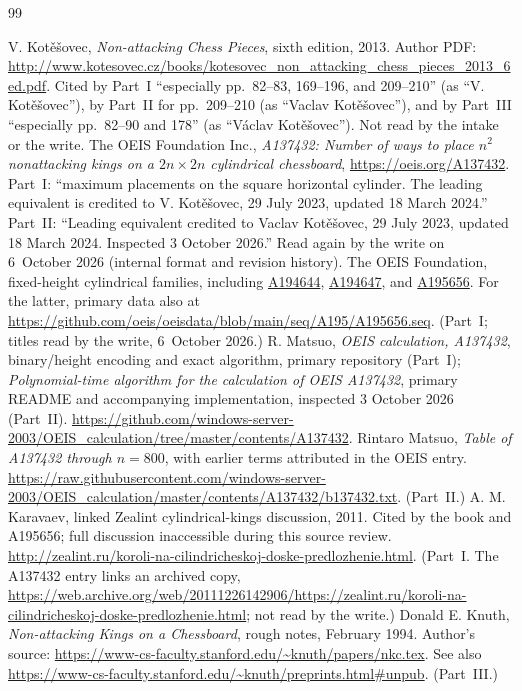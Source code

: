 \documentclass[11pt,letterpaper]{article}
\numberwithin{equation}{section}
\theoremstyle{remark}\newtheorem{remark}[theorem]{Remark}
\begin{document}
\begin{thebibliography}{99}\small\raggedright
{}V. Kot\v{e}\v{s}ovec, \emph{Non-attacking Chess Pieces}, sixth edition, 2013. Author PDF: \url{http://www.kotesovec.cz/books/kotesovec_non_attacking_chess_pieces_2013_6ed.pdf}. Cited by Part~I ``especially pp.~82--83, 169--196, and 209--210'' (as ``V. Kot\v{e}\v{s}ovec''), by Part~II for pp.~209--210 (as ``Vaclav Kot\v{e}\v{s}ovec''), and by Part~III ``especially pp.~82--90 and 178'' (as ``V\'aclav Kot\v e\v sovec''). Not read by the intake or the write.
The OEIS Foundation Inc., \emph{A137432: Number of ways to place $n^2$ nonattacking kings on a $2n\times2n$ cylindrical chessboard}, \url{https://oeis.org/A137432}. Part~I: ``maximum placements on the square horizontal cylinder. The leading equivalent is credited to V. Kot\v{e}\v{s}ovec, 29 July 2023, updated 18 March 2024.'' Part~II: ``Leading equivalent credited to Vaclav Kot\v{e}\v{s}ovec, 29 July 2023, updated 18 March 2024. Inspected 3 October 2026.'' Read again by the write on 6~October 2026 (internal format and revision history).
The OEIS Foundation, fixed-height cylindrical families, including \href{https://oeis.org/A194644}{A194644}, \href{https://oeis.org/A194647}{A194647}, and \href{https://oeis.org/A195656}{A195656}. For the latter, primary data also at \url{https://github.com/oeis/oeisdata/blob/main/seq/A195/A195656.seq}. (Part~I; titles read by the write, 6~October 2026.)
R. Matsuo, \emph{OEIS calculation, A137432}, binary/height encoding and exact algorithm, primary repository (Part~I); \emph{Polynomial-time algorithm for the calculation of OEIS A137432}, primary README and accompanying implementation, inspected 3 October 2026 (Part~II). \url{https://github.com/windows-server-2003/OEIS_calculation/tree/master/contents/A137432}.
Rintaro Matsuo, \emph{Table of A137432 through $n=800$}, with earlier terms attributed in the OEIS entry. \url{https://raw.githubusercontent.com/windows-server-2003/OEIS_calculation/master/contents/A137432/b137432.txt}. (Part~II.)
A. M. Karavaev, linked Zealint cylindrical-kings discussion, 2011. Cited by the book and A195656; full discussion inaccessible during this source review. \url{http://zealint.ru/koroli-na-cilindricheskoj-doske-predlozhenie.html}. (Part~I. The A137432 entry links an archived copy, \url{https://web.archive.org/web/20111226142906/https://zealint.ru/koroli-na-cilindricheskoj-doske-predlozhenie.html}; not read by the write.)
Donald E. Knuth, \emph{Non-attacking Kings on a Chessboard}, rough notes, February 1994. Author's source: \url{https://www-cs-faculty.stanford.edu/~knuth/papers/nkc.tex}. See also \url{https://www-cs-faculty.stanford.edu/~knuth/preprints.html#unpub}. (Part~III.)

\end{thebibliography}
\end{document}
